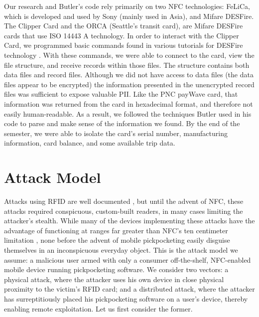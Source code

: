 \documentclass{IEEEtran}
\begin{document}
Our research and Butler's code rely primarily on two NFC technologies: FeLiCa, which is developed and used by Sony (mainly used in Asia), and Mifare DESFire. The Clipper Card and the ORCA (Seattle's transit card), are Mifare DESFire cards that use ISO 14443 A technology.  In order to interact with the Clipper Card, we programmed basic commands found in various tutorials for DESFire technology \cite{public-transport-card-exploits}.  With these commands, we were able to connect to the card, view the file structure, and receive records within those files.  The structure contains both data files and record files.  Although we did not have access to data files (the data files appear to be encrypted) the information presented in the unencrypted record files was sufficient to expose valuable PII.  Like the PNC payWave card, that information was returned from the card in hexadecimal format, and therefore not easily human-readable.  As a result, we followed the techniques Butler used in his code to parse and make sense of the information we found.  By the end of the semester, we were able to isolate the card's serial number, manufacturing information, card balance, and some available trip data.

\section{Attack Model}
Attacks using RFID are well documented \cite{picking-virtual-pockets} \cite{eavesdropping-attacks-hfrfid-tokens}, but until the advent of NFC, these attacks required conspicuous, custom-built readers, in many cases limiting the attacker's stealth.  While many of the devices implementing these attacks have the advantage of functioning at ranges far greater than NFC's ten centimeter limitation \cite{Kirschenbaum06howto}, none before the advent of mobile pickpocketing easily disguise themselves in an inconspicuous everyday object.  This is the attack model we assume:  a malicious user armed with only a consumer off-the-shelf, NFC-enabled mobile device running pickpocketing software.  We consider two vectors:  a physical attack, where the attacker uses his own device in close physical proximity to the victim's RFID card; and a distributed attack, where the attacker has surreptitiously placed his pickpocketing software on a user's device, thereby enabling remote exploitation.  Let us first consider the former.  
\end{document}

